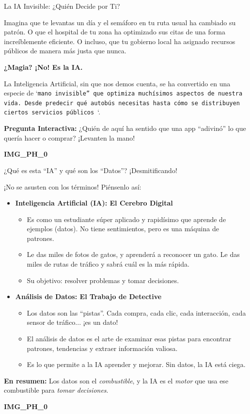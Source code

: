\documentclass[aspectratio=169]{beamer}
\begin{document}
\begin{frame}[fragile]{La IA Invisible: ¿Quién Decide por Ti?}


Imagina que te levantas un día y el semáforo en tu ruta usual ha cambiado su patrón. O que el hospital de tu zona ha optimizado sus citas de una forma increíblemente eficiente. O incluso, que tu gobierno local ha asignado recursos públicos de manera más justa que nunca.

\textbf{¿Magia? ¡No! Es la IA.}

La Inteligencia Artificial, sin que nos demos cuenta, se ha convertido en una especie de `\texttt{mano invisible'' que optimiza muchísimos aspectos de nuestra vida. Desde predecir qué autobús necesitas hasta cómo se distribuyen ciertos servicios públicos }\cite{Aparicio Araque, 2025}`.

\textbf{Pregunta Interactiva:} ¿Quién de aquí ha sentido que una app ``adivinó'' lo que quería hacer o comprar? ¡Levanten la mano!

\textbf{IMG\_PH\_0}

\end{frame}



\begin{frame}[fragile]{¿Qué es esta ``IA'' y qué son los ``Datos''? ¡Desmitificando!}


¡No se asusten con los términos! Piénsenlo así:

\begin{itemize}
  \item \textbf{Inteligencia Artificial (IA): El Cerebro Digital}
  \begin{itemize}
    \item Es como un estudiante súper aplicado y rapidísimo que aprende de ejemplos (datos). No tiene sentimientos, pero es una máquina de patrones.
    \item Le das miles de fotos de gatos, y aprenderá a reconocer un gato. Le das miles de rutas de tráfico y sabrá cuál es la más rápida.
    \item Su objetivo: resolver problemas y tomar decisiones.
  \end{itemize}
  \item \textbf{Análisis de Datos: El Trabajo de Detective}
  \begin{itemize}
    \item Los datos son las ``pistas''. Cada compra, cada clic, cada interacción, cada sensor de tráfico... ¡es un dato!
    \item El análisis de datos es el arte de examinar esas pistas para encontrar patrones, tendencias y extraer información valiosa.
    \item Es lo que permite a la IA aprender y mejorar. Sin datos, la IA está ciega.
  \end{itemize}
\end{itemize}
\textbf{En resumen:} Los datos son el \textit{combustible}, y la IA es el \textit{motor} que usa ese combustible para \textit{tomar decisiones}.

\textbf{IMG\_PH\_0}

\end{frame}
\end{document}
